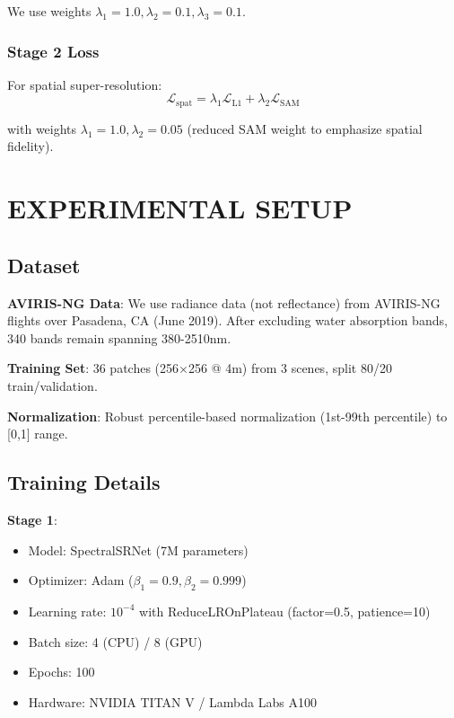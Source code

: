 \documentclass[]{spieman}
\begin{document}
We use weights $\lambda_1=1.0, \lambda_2=0.1, \lambda_3=0.1$.

\subsubsection{Stage 2 Loss}

For spatial super-resolution:
\begin{equation}
\mathcal{L}_{\text{spat}} = \lambda_1 \mathcal{L}_{\text{L1}} + \lambda_2 \mathcal{L}_{\text{SAM}}
\end{equation}

with weights $\lambda_1=1.0, \lambda_2=0.05$ (reduced SAM weight to emphasize spatial fidelity).

\section{EXPERIMENTAL SETUP}
\label{sec:experiments}

\subsection{Dataset}

\textbf{AVIRIS-NG Data}: We use radiance data (not reflectance) from AVIRIS-NG flights over Pasadena, CA (June 2019). After excluding water absorption bands, 340 bands remain spanning 380-2510nm.

\textbf{Training Set}: 36 patches (256×256 @ 4m) from 3 scenes, split 80/20 train/validation.

\textbf{Normalization}: Robust percentile-based normalization (1st-99th percentile) to [0,1] range.

\subsection{Training Details}

\textbf{Stage 1}:
\begin{itemize}
\item Model: SpectralSRNet (7M parameters)
\item Optimizer: Adam ($\beta_1=0.9, \beta_2=0.999$)
\item Learning rate: $10^{-4}$ with ReduceLROnPlateau (factor=0.5, patience=10)
\item Batch size: 4 (CPU) / 8 (GPU)
\item Epochs: 100
\item Hardware: NVIDIA TITAN V / Lambda Labs A100
\end{itemize}
\end{document}
